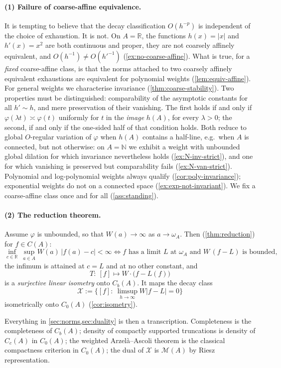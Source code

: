 \documentclass[11pt,a4paper]{article}
\numberwithin{equation}{section}
\theoremstyle{plain}
\theoremstyle{definition}
\theoremstyle{remark}
\newcommand{\R}{\mathbb{R}}
\newcommand{\N}{\mathbb{N}}
\newcommand{\wA}{\omega_A}
\newcommand{\Cb}{C_b}
\newcommand{\Cz}{C_0}
\newcommand{\Msp}{\mathcal{M}}
\newcommand{\Xdec}{\mathcal{X}}
\begin{document}
\paragraph{(1) Failure of coarse-affine equivalence.} It is tempting to believe that the
decay classification $O(h^{-p})$ is independent of the choice of exhaustion. It is not.
On $A=\R$, the functions $h(x)=|x|$ and $h'(x)=x^{2}$ are both continuous and proper, they
are not coarsely affinely equivalent, and $O(h^{-1})\ne O(h'^{-1})$
(\cref{ex:no-coarse-affine}). What is true, for a \emph{fixed} coarse-affine class, is that the norms attached to two
coarsely affinely equivalent exhaustions are equivalent for polynomial weights
(\cref{lem:equiv-affine}). For general weights we characterise invariance
(\cref{thm:coarse-stability}). Two properties must be distinguished: comparability of the
asymptotic constants for all $h'\sim h$, and mere preservation of their vanishing. The
first holds if and only if $\varphi(\lambda t)\asymp\varphi(t)$ uniformly for $t$ in the
\emph{image} $h(A)$, for every $\lambda>0$; the second, if and only if the one-sided half
of that condition holds. Both reduce to global $O$-regular variation of $\varphi$ when
$h(A)$ contains a half-line, e.g.\ when $A$ is connected, but not otherwise: on $A=\N$ we
exhibit a weight with unbounded global dilation for which invariance nevertheless holds
(\cref{ex:N-inv-strict}), and one for which vanishing is preserved but comparability fails
(\cref{ex:N-van-strict}). Polynomial and log-polynomial weights always qualify
(\cref{cor:poly-invariance}); exponential weights do not on a connected space
(\cref{ex:exp-not-invariant}). We fix a coarse-affine class once and for all
(\cref{ass:standing}).

\paragraph{(2) The reduction theorem.} Assume $\varphi$ is unbounded, so that
$W(a)\to\infty$ as $a\to\wA$. Then (\cref{thm:reduction}) for $f\in C(A)$:
\[
\inf_{c\in\R}\ \sup_{a\in A} W(a)\,|f(a)-c| <\infty
\iff
\text{$f$ has a limit $L$ at $\wA$ and $W\,(f-L)$ is bounded},
\]
the infimum is attained at $c=L$ and at no other constant, and
\[
T:\ [f]\longmapsto W\cdot\bigl(f-L(f)\bigr)
\]
is a \emph{surjective linear isometry} onto $\Cb(A)$. It maps the decay class
\[
\Xdec:=\bigl\{[f]:\ \textstyle\limsup_{h\to\infty}W|f-L|=0\bigr\}
\]
isometrically onto $\Cz(A)$ (\cref{cor:isometry}).

Everything in \cref{sec:norms,sec:duality} is then a transcription. Completeness is the
completeness of $\Cb(A)$; density of compactly supported truncations is density of
$C_c(A)$ in $\Cz(A)$; the weighted Arzel\`a--Ascoli theorem is the classical compactness
criterion in $\Cz(A)$; the dual of $\Xdec$ is $\Msp(A)$ by Riesz representation.
\end{document}
